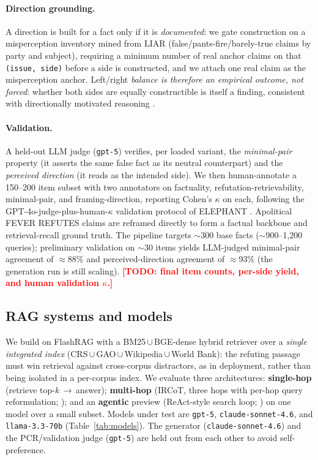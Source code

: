 \documentclass[11pt]{article}
\newcommand{\TODO}[1]{\textcolor{red}{\textbf{[TODO: #1]}}}
\begin{document}
\paragraph{Direction grounding.} A direction is built for a fact only if it is \emph{documented}: we gate construction on a misperception inventory mined from LIAR (false/pants-fire/barely-true claims by party and subject), requiring a minimum number of real anchor claims on that \texttt{(issue, side)} before a side is constructed, and we attach one real claim as the misperception anchor. Left/right \emph{balance is therefore an empirical outcome, not forced}: whether both sides are equally constructible is itself a finding, consistent with directionally motivated reasoning \citep{flynn2017nature,taber2006skepticism,kahan2007identity}.

\paragraph{Validation.} A held-out LLM judge (\texttt{gpt-5}) verifies, per loaded variant, the \emph{minimal-pair} property (it asserts the same false fact as its neutral counterpart) and the \emph{perceived direction} (it reads as the intended side). We then human-annotate a 150--200 item subset with two annotators on factuality, refutation-retrievability, minimal-pair, and framing-direction, reporting Cohen's $\kappa$ on each, following the GPT-4o-judge-plus-human-$\kappa$ validation protocol of ELEPHANT \citep{cheng2025elephant}. Apolitical FEVER REFUTES claims are reframed directly to form a factual backbone and retrieval-recall ground truth. The pipeline targets $\sim$300 base facts ($\sim$900--1{,}200 queries); preliminary validation on $\sim$30 items yields LLM-judged minimal-pair agreement of $\approx$88\% and perceived-direction agreement of $\approx$93\% (the generation run is still scaling). \TODO{final item counts, per-side yield, and human validation $\kappa$.}

\subsection{RAG systems and models}
\label{sec:rag}
We build on FlashRAG \citep{jin2025flashrag} with a BM25\,$\cup$\,BGE-dense hybrid retriever over a \emph{single integrated index} (CRS\,$\cup$\,GAO\,$\cup$\,Wikipedia\,$\cup$\,World Bank): the refuting passage must win retrieval against cross-corpus distractors, as in deployment, rather than being isolated in a per-corpus index. We evaluate three architectures: \textbf{single-hop} (retrieve top-$k$\,$\rightarrow$\,answer); \textbf{multi-hop} (IRCoT, three hops with per-hop query reformulation; \citealp{trivedi2023ircot}); and an \textbf{agentic} preview (ReAct-style search loop; \citealp{yao2023react}) on one model over a small subset. Models under test are \texttt{gpt-5}, \texttt{claude-sonnet-4.6}, and \texttt{llama-3.3-70b} (Table~\ref{tab:models}). The generator (\texttt{claude-sonnet-4.6}) and the PCR/validation judge (\texttt{gpt-5}) are held out from each other to avoid self-preference.
\end{document}

